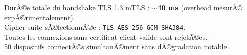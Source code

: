 \begin{tcolorbox}[colback=green!5, colframe=green!50!black, title=RÃ©sultat TLS/mTLS]
DurÃ©e totale du handshake TLS 1.3 mTLS : \textbf{$\sim$40 ms} (overhead mesurÃ© expÃ©rimentalement).\\
Cipher suite sÃ©lectionnÃ©e : \texttt{TLS\_AES\_256\_GCM\_SHA384}.\\
Toutes les connexions sans certificat client valide sont rejetÃ©es.\\
50 dispositifs connectÃ©s simultanÃ©ment sans dÃ©gradation notable.
\end{tcolorbox}
